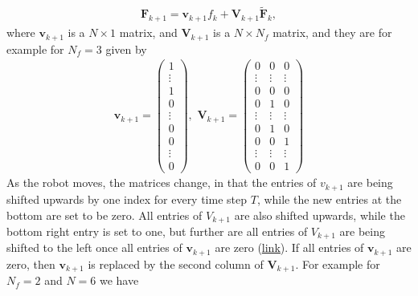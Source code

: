 \begin{align}
	\bm{F}_{k+1} = \bm{v}_{k+1}f_k + \bm{V}_{k+1}\tilde{\bm{F}}_k,
	\label{eq:312_feet}
\end{align}
where $\bm{v}_{k+1}$ is a $N\times1$ matrix, and $\bm{V}_{k+1}$ is a $N\times N_f$ matrix, and they are for example for $N_f = 3$ given by
\begin{align}
	\bm{v}_{k+1} = \begin{pmatrix}
	1 \\ 
	\vdots \\
	1 \\
	0 \\
	\vdots \\
	0 \\
	0 \\
	\vdots \\
	0
	\end{pmatrix},\,\, 
	\bm{V}_{k+1} = \begin{pmatrix}
	0 & 0 & 0\\
	\vdots & \vdots & \vdots \\
	0 & 0 & 0 \\
	0 & 1 & 0 \\
	\vdots & \vdots & \vdots \\
	0 & 1 & 0 \\
	0 & 0 & 1 \\
	\vdots & \vdots & \vdots \\
	0 & 0 & 1
	\end{pmatrix}
\end{align}
As the robot moves, the matrices change, in that the entries of $v_{k+1}$ are being shifted upwards by one index for every time step $T$, while the new entries at the bottom are set to be zero. All entries of $V_{k+1}$ are also shifted upwards, while the bottom right entry is set to one, but further are all entries of $V_{k+1}$ are being shifted to the left once all entries of $\bm{v}_{k+1}$ are zero (\href{https://github.com/mhubii/nmpc_pattern_generator/blob/5a213044c927dc6aac9f7e32ce1e5fb472cd67bb/libs/pattern_generator/src/base_generator.cpp#L740}{\underline{link}}). If all entries of $\bm{v}_{k+1}$ are zero, then $\bm{v}_{k+1}$ is replaced by the second column of $\bm{V}_{k+1}$. For example for $N_f = 2$ and $N=6$  we have
